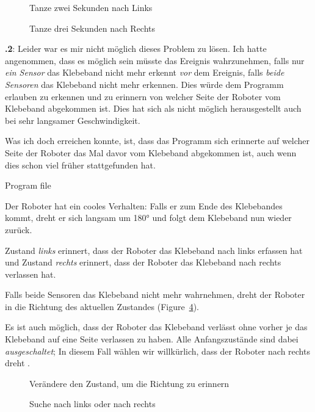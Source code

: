 \documentclass[12pt,a4paper,ngerman]{article}
\begin{document}
\begin{figure}
\begin{center}
\caption{Tanze zwei Sekunden nach Links}
\label{fig.dance-left}
\end{center}
\end{figure}

\begin{figure}
\begin{center}
\caption{Tanze drei Sekunden nach Rechts}
\label{fig.dance-right}
\end{center}
\end{figure}

\textbf{\thesection.2}:
Leider war es mir nicht möglich dieses Problem zu lösen. Ich hatte angenommen, dass es möglich sein müsste das Ereignis wahrzunehmen, falls nur  \emph{ein Sensor} das Klebeband nicht mehr erkennt \emph{vor} dem Ereignis, falls \emph{beide Sensoren} das Klebeband nicht mehr erkennen. Dies würde dem Programm erlauben zu erkennen und zu erinnern von welcher Seite der Roboter vom Klebeband abgekommen ist. Dies hat sich als nicht möglich herausgestellt auch bei sehr langsamer Geschwindigkeit. 

Was ich doch erreichen konnte, ist, dass das Programm sich erinnerte auf welcher Seite der Roboter das Mal davor vom Klebeband abgekommen ist, auch wenn dies schon viel früher stattgefunden hat.

{\raggedleft \hfill Program file }

Der Roboter hat ein cooles Verhalten: Falls er zum Ende des Klebebandes kommt, dreht er sich langsam um 180° und folgt dem Klebeband nun wieder zurück.

Zustand \emph{links}  erinnert, dass der Roboter das Klebeband nach links erfassen hat und Zustand \emph{rechts}  erinnert, dass der Roboter das Klebeband nach rechts verlassen hat.

Falls beide Sensoren das Klebeband nicht mehr wahrnehmen, dreht der Roboter in die Richtung des aktuellen Zustandes (Figure~\ref{fig.follow1}).

Es ist auch möglich, dass der Roboter das Klebeband verlässt ohne vorher je das Klebeband auf eine Seite verlassen zu haben. Alle Anfangszustände sind dabei \emph{ausgeschaltet}; In diesem Fall wählen wir willkürlich, dass der Roboter nach rechts dreht  .

\begin{figure}
\begin{center}
\caption{Verändere den Zustand, um die Richtung zu erinnern}
\label{fig.follow3}
\end{center}
\end{figure}

\begin{figure}
\begin{center}
\caption{Suche nach links oder nach rechts}
\label{fig.follow1}
\end{center}
\end{figure}
\end{document}
